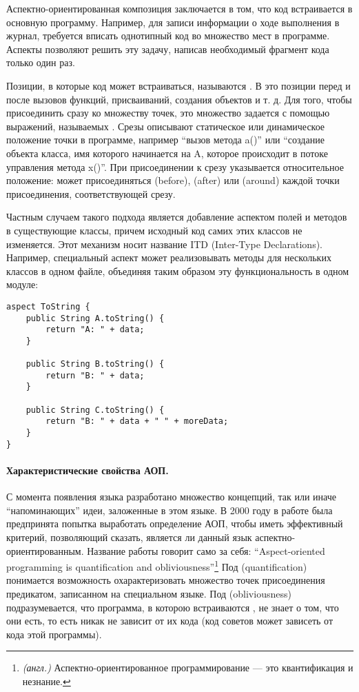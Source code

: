Аспектно-ориентированная композиция заключается в том, что код  встраивается в основную программу. Например, для записи информации о ходе выполнения в журнал, требуется вписать однотипный код во множество мест в программе. Аспекты позволяют решить эту задачу, написав необходимый фрагмент кода только один раз.

Позиции, в которые код может встраиваться, называются . В  это позиции перед и после вызовов функций, присваиваний, создания объектов и т. д. Для того, чтобы присоединить  сразу ко множеству точек, это множество задается с помощью выражений, называемых . Срезы описывают статическое или динамическое положение точки в программе, например ``вызов метода a()'' или ``создание объекта класса, имя которого начинается на A, которое происходит в потоке управления метода x()''. При присоединении  к срезу указывается относительное положение:  может присоединяться  (before),  (after) или  (around) каждой точки присоединения, соответствующей срезу.

Частным случаем такого подхода является добавление аспектом полей и методов в существующие классы, причем исходный код самих этих классов не изменяется. Этот механизм носит название ITD (Inter-Type Declarations). Например, специальный аспект может реализовывать методы  для нескольких классов в одном файле, объединяя таким образом эту функциональность в одном модуле:

\begin{lstlisting}[language={[AspectJ]Java}]
aspect ToString {
	public String A.toString() {
		return "A: " + data;
	}

	public String B.toString() {
		return "B: " + data;
	}

	public String C.toString() {
		return "B: " + data + " " + moreData;
	}
}
\end{lstlisting}

\paragraph*{Характеристические свойства АОП.} С момента появления языка  разработано множество концепций, так или иначе ``напоминающих'' идеи, заложенные в этом языке. В 2000 году в работе \cite{Obliviousness} была предпринята попытка выработать определение АОП, чтобы иметь эффективный критерий, позволяющий сказать, является ли данный язык аспектно-ориентированным. Название работы говорит само за себя: ``Aspect-oriented programming is quantification and obliviousness''\footnote{\textit{(англ.)} Аспектно-ориентированное программирование --- это квантификация и незнание.}
Под  (quantification) понимается возможность охарактеризовать множество точек присоединения предикатом, записанном на специальном языке. Под  (obliviousness) подразумевается, что программа, в которою встраиваются , не знает о том, что они есть, то есть никак не зависит от их кода (код советов может зависеть от кода этой программы).

